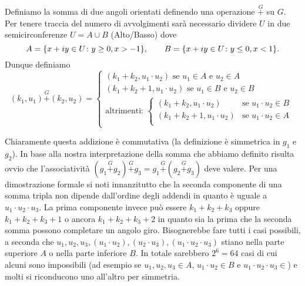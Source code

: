 Definiamo la somma di due angoli orientati definendo 
una operazione $\stackrel G+$ su $G$.
Per tenere traccia del numero di avvolgimenti sarà 
necessario dividere $U$ in due semicirconferenze
$U = A \cup B$ (Alto/Basso) dove 
\[
A = {\left\{ x+iy\in U\colon y\ge 0, x>-1 \right\}}, 
\qquad
B = {\left\{ x+iy\in U\colon y\le 0, x<1 \right\}}.
\]
Dunque definiamo
%
\begin{equation}\label{eq:somma_su_G}
(k_1,u_1) \stackrel G+ (k_2,u_2) 
= 
\begin{cases} 
  (k_1+k_2, u_1\cdot u_2)  
  \text{ se $u_1\in A$ e $u_2\in A$} \\
  (k_1+k_2+1, u_1\cdot u_2) 
  \text{ se $u_1\in B$ e $u_2\in B$} \\
  \text{altrimenti: }
  \begin{cases}
    (k_1+k_2, u_1\cdot u_2) & \text{se $u_1\cdot u_2\in B$}\\
    (k_1+k_2+1, u_1\cdot u_2) & \text{se $u_1\cdot u_2\in A$}\\    
  \end{cases}
\end{cases}
\end{equation}

Chiaramente questa addizione è commutativa (la definizione è simmetrica 
in $g_1$ e $g_2$). 
In base alla nostra interpretazione della 
somma che abbiamo definito risulta ovvio che 
l'associatività
$(g_1 \stackrel G+ g_2)\stackrel G+ g_3  
= g_1 \stackrel G+ (g_2\stackrel G+ g_3)$
deve valere.
Per una dimostrazione formale si noti innanzitutto che
la seconda componente di una somma tripla non dipende 
dall'ordine degli addendi in quanto è uguale a
$u_1\cdot u_2 \cdot u_3$. 
La prima componente invece può essere $k_1+k_2+k_3$ 
oppure $k_1+k_2+k_3+1$ o ancora $k_1+k_2+k_3+2$
in quanto sia la prima che la seconda
somma possono completare un angolo giro.
Bisognerebbe fare tutti i casi possibili, a seconda 
che 
$u_1, u_2, u_3, (u_1\cdot u_2), (u_2\cdot u_3), 
(u_1\cdot u_2 \cdot u_3)$ 
stiano nella parte superiore $A$ o nella parte inferiore $B$.
In totale sarebbero $2^6=64$ casi di cui alcuni sono impossibili
(ad esempio se $u_1,u_2,u_3\in A$, 
$u_1\cdot u_2\in B$ e $u_1\cdot u_2\cdot u_3 \in $)
e molti si riconducono uno all'altro per simmetria.

